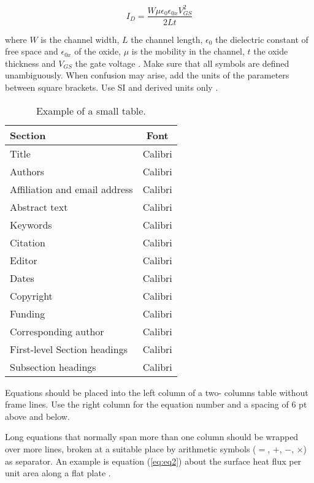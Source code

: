 \documentclass[final]{imeko_acta}
\begin{document}
\begin{equation}\label{eq:eq1}
	I_D = \frac{W \mu \epsilon_0 \epsilon_{0x} V^2_{GS}}{2Lt}
\end{equation}

where $W$ is the channel width, $L$ the channel length, $\epsilon_0$ the dielectric constant of free space and $\epsilon_{0x}$ of the oxide, $\mu$ is the mobility in the channel, $t$ the oxide thickness and $V_{GS}$ the gate voltage \cite{Middelhoek1989}. Make sure that all symbols are defined unambiguously. When confusion may arise, add the units of the parameters between square brackets. Use SI and derived units only \cite{Grattan1994}. 

\begin{table}[!b]
	\caption{Example of a small table.}
	\label{tab:tab2}
	\centering
	\begin{tabularx}{\columnwidth}{lC}
		\toprule{}
		Section & Font \\
		\midrule
		Title & Calibri \\
		Authors & Calibri \\
		Affiliation and email address & Calibri \\
		Abstract text & Calibri \\
		Keywords & Calibri \\
		Citation & Calibri \\
		Editor & Calibri \\
		Dates & Calibri \\
		Copyright & Calibri \\
		Funding & Calibri \\
		Corresponding author & Calibri \\
		First-level Section headings  & Calibri \\
		Subsection headings & Calibri \\
		\bottomrule
	\end{tabularx}
\end{table}

Equations should be placed into the left column of a two-
columns table without frame lines. Use the right column for the
equation number and a spacing of 6 pt above and below.

Long equations that normally span more than one column should be wrapped over more lines, broken at a suitable place by arithmetic symbols ($=$, $+$, $-$, $\times$) as separator. An example is equation  (\ref{eq:eq2}) about the surface heat flux per unit area along a flat plate \cite{Lighthill1950}.
\end{document}
